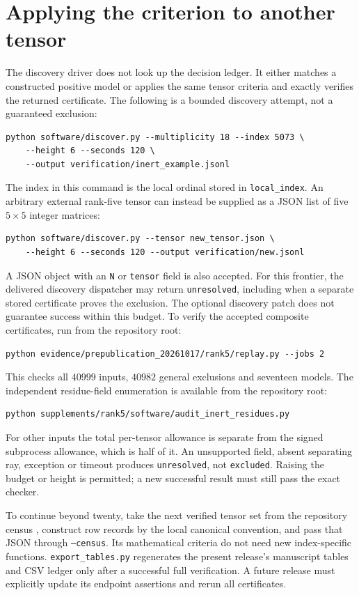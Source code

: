 \documentclass[11pt]{article}
\begin{document}
\section{Applying the criterion to another tensor}
The discovery driver does not look up the decision ledger. It either
matches a constructed positive model or applies the same tensor criteria
and exactly verifies the returned certificate. The following is a bounded discovery attempt, not a guaranteed exclusion:
\begin{verbatim}
python software/discover.py --multiplicity 18 --index 5073 \
    --height 6 --seconds 120 \
    --output verification/inert_example.jsonl
\end{verbatim}
The index in this command is the local ordinal stored in
\texttt{local\_index}. An arbitrary
external rank-five tensor can instead be supplied as a JSON list of
five $5\times5$ integer matrices:
\begin{verbatim}
python software/discover.py --tensor new_tensor.json \
    --height 6 --seconds 120 --output verification/new.jsonl
\end{verbatim}
A JSON object with an \texttt{N} or \texttt{tensor} field is also accepted.
For this frontier, the delivered discovery dispatcher may return
\texttt{unresolved}, including when a separate stored certificate proves
the exclusion. The optional discovery patch does not guarantee success
within this budget. To verify the accepted composite certificates, run
from the repository root:
\begin{verbatim}
python evidence/prepublication_20261017/rank5/replay.py --jobs 2
\end{verbatim}
This checks all $40999$ inputs, $40982$ general exclusions and seventeen
models. The independent residue-field enumeration is available from the repository root:
\begin{verbatim}
python supplements/rank5/software/audit_inert_residues.py
\end{verbatim}
For other inputs the total per-tensor allowance is separate from the signed subprocess
allowance, which is half of it. An unsupported field, absent separating
ray, exception or timeout produces \texttt{unresolved}, not
\texttt{excluded}. Raising the budget or height is permitted; a new
successful result must still pass the exact checker.

To continue beyond twenty, take the next verified tensor set from the
repository census \cite{Census}, construct row records by the local
canonical convention, and pass that JSON through \texttt{--census}. Its mathematical criteria
do not need new index-specific functions. \texttt{export\_tables.py}
regenerates the present release's manuscript tables and CSV ledger only
after a successful full verification. A future release must explicitly
update its endpoint assertions and rerun all certificates.
\end{document}
